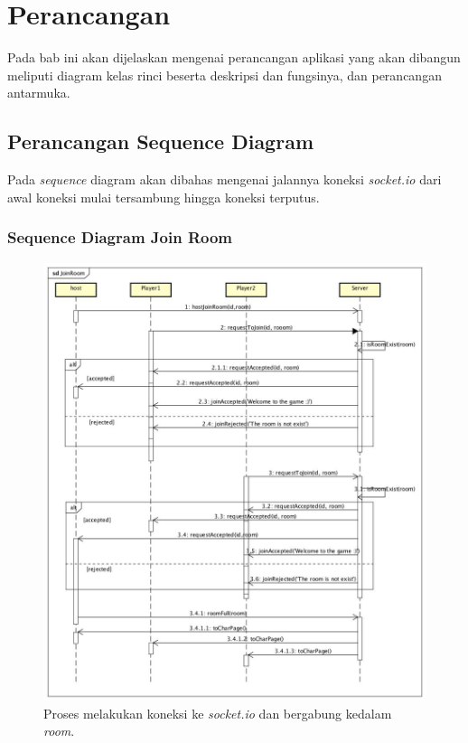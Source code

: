 \chapter{Perancangan}
\label{chap:perancangan}

Pada bab ini akan dijelaskan mengenai perancangan aplikasi yang akan dibangun meliputi diagram kelas rinci beserta deskripsi dan fungsinya, dan perancangan antarmuka.

\section{Perancangan Sequence Diagram}

Pada \textit{sequence} diagram akan dibahas mengenai jalannya koneksi \textit{socket.io} dari awal koneksi mulai tersambung hingga koneksi terputus.

\subsection{Sequence Diagram Join Room}

\begin{figure}[H]
	\centering
	\includegraphics[scale=0.3]{Gambar/JoinRoom}
	\caption{Proses melakukan koneksi ke \textit{socket.io} dan bergabung kedalam \textit{room}.}
	\label{fig:1_JoinRoom}
\end{figure}


